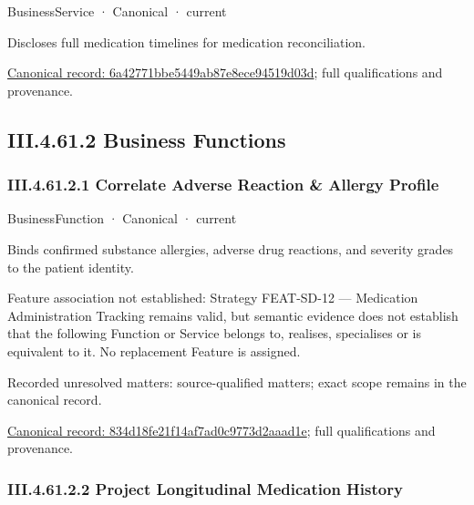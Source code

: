 \label{element:6a42771bbe5449ab87e8ece94519d03d}
{\small BusinessService · Canonical · current}\par

Discloses full medication timelines for medication reconciliation.


{\footnotesize \href{../../../../continuum/business/business-service/6a42771bbe5449ab87e8ece94519d03d.md}{Canonical record: 6a42771bbe5449ab87e8ece94519d03d}; full qualifications and provenance.}\par
\subsection*{III.4.61.2 Business Functions}
\label{navigation:III.4.61.2}

\subsubsection*{III.4.61.2.1 Correlate Adverse Reaction \& Allergy Profile}
\label{navigation:III.4.61.2.1}

\label{element:834d18fe21f14af7ad0c9773d2aaad1e}
{\small BusinessFunction · Canonical · current}\par

Binds confirmed substance allergies, adverse drug reactions, and severity grades to the patient identity.



Feature association not established: Strategy FEAT-SD-12 — Medication Administration Tracking remains valid, but semantic evidence does not establish that the following Function or Service belongs to, realises, specialises or is equivalent to it. No replacement Feature is assigned.


{\small Recorded unresolved matters: source-qualified matters; exact scope remains in the canonical record.}\par
{\footnotesize \href{../../../../continuum/business/business-function/834d18fe21f14af7ad0c9773d2aaad1e.md}{Canonical record: 834d18fe21f14af7ad0c9773d2aaad1e}; full qualifications and provenance.}\par
\subsubsection*{III.4.61.2.2 Project Longitudinal Medication History}
\label{navigation:III.4.61.2.2}


